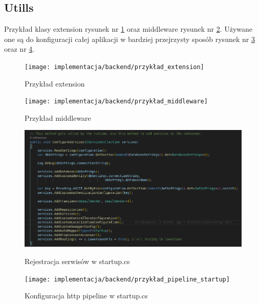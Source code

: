 \documentclass[a4paper,11pt]{report}
\begin{document}
\subsection{Utills}
Przykład klasy extension rysunek nr \ref{fig:gamitude_extension} oraz  middleware rysunek nr \ref{fig:gamitude_middleware}.
Używane one są do konfiguracji całej aplikacji w bardziej przejrzysty sposób rysunek nr \ref{fig:gamitude_services_startup} oraz nr \ref{fig:gamitude_pipeline_startup}.
\begin{figure}[H]
	\centering
	\texttt{[image: implementacja/backend/przykład\_extension]}\\
	\caption{Przykład extension}
	\label{fig:gamitude_extension}
\end{figure}
\begin{figure}[H]
	\centering
	\texttt{[image: implementacja/backend/przykład\_middleware]}\\
	\caption{Przykład middleware}
	\label{fig:gamitude_middleware}
\end{figure}
\begin{figure}[H]
	\centering
	\includegraphics[scale=0.3]{implementacja/backend/register_services_startup}\\
	\caption{Rejestracja serwisów w startup.cs}
	\label{fig:gamitude_services_startup}
\end{figure}
\begin{figure}[H]
	\centering
	\texttt{[image: implementacja/backend/przykład\_pipeline\_startup]}\\
	\caption{Konfiguracja http pipeline w startup.cs}
	\label{fig:gamitude_pipeline_startup}
\end{figure}
\end{document}
